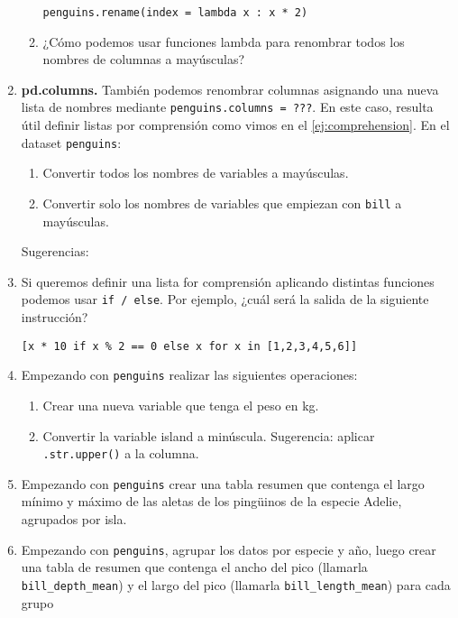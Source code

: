 \documentclass[a4paper,11pt]{article}
\theoremstyle{definition}
\begin{document}
\begin{enumerate}
\begin{enumerate}
\lstinline{penguins.rename(index = lambda x : x * 2)}

\item ¿Cómo podemos usar funciones lambda para renombrar todos los nombres de columnas a mayúsculas?
\end{enumerate}


\item \textbf{pd.columns.} También podemos renombrar columnas asignando una nueva lista de nombres mediante \lstinline{penguins.columns = ???}. En este caso, resulta útil definir listas por comprensión como vimos en el \ref{ej:comprehension}. En el dataset \lstinline{penguins}:
    
\begin{enumerate}
\item Convertir todos los nombres de variables a mayúsculas.
\item Convertir solo los nombres de variables que empiezan con \lstinline{bill} a mayúsculas.
\end{enumerate}

Sugerencias: 
\item Si queremos definir una lista for comprensión aplicando distintas funciones podemos usar \lstinline{if / else}. Por ejemplo, ¿cuál será la salida de la siguiente instrucción?

\lstinline{[x * 10 if x % 2 == 0 else x for x in [1,2,3,4,5,6]]}


\item Empezando con \lstinline{penguins} realizar las siguientes operaciones:
\begin{enumerate}
\item Crear una nueva variable que tenga el peso en kg.
\item Convertir la variable island a minúscula. Sugerencia: aplicar \lstinline{.str.upper()} a la columna.
\end{enumerate}

\item Empezando con \lstinline{penguins} crear una tabla resumen que contenga el largo mínimo y máximo de las aletas de los ping\"uinos de la especie Adelie, agrupados por isla.

\item Empezando con \lstinline{penguins}, agrupar los datos por especie y año, luego crear una tabla de resumen que contenga el ancho del pico (llamarla \lstinline{bill_depth_mean}) y el largo del pico (llamarla \lstinline{bill_length_mean}) para cada grupo


\end{enumerate}
\end{document}
